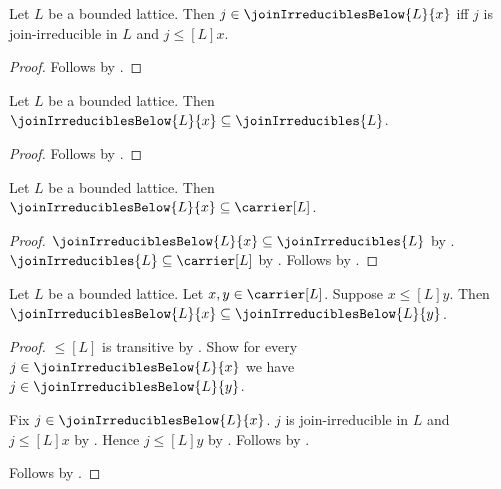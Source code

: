 \begin{proposition}\label{join_irreducibles_below_iff}
    Let $L$ be a bounded lattice.
    Then $j\in\joinIrreduciblesBelow{L}{x}$ iff
        $j$ is join-irreducible in $L$ and $j\mathrel{\leq[L]}x$.
\end{proposition}
\begin{proof}
    Follows by
        .
\end{proof}

\begin{proposition}\label{join_irreducibles_below_subseteq_join_irreducibles}
    Let $L$ be a bounded lattice.
    Then $\joinIrreduciblesBelow{L}{x}\subseteq\joinIrreducibles{L}$.
\end{proposition}
\begin{proof}
    Follows by .
\end{proof}

\begin{proposition}\label{join_irreducibles_below_subseteq_carrier}
    Let $L$ be a bounded lattice.
    Then $\joinIrreduciblesBelow{L}{x}\subseteq\carrier[L]$.
\end{proposition}
\begin{proof}
    $\joinIrreduciblesBelow{L}{x}\subseteq\joinIrreducibles{L}$ by
        .
    $\joinIrreducibles{L}\subseteq\carrier[L]$ by
        .
    Follows by .
\end{proof}

\begin{proposition}\label{join_irreducibles_below_monotone}
    Let $L$ be a bounded lattice.
    Let $x,y\in\carrier[L]$.
    Suppose $x\mathrel{\leq[L]}y$.
    Then $\joinIrreduciblesBelow{L}{x}
        \subseteq\joinIrreduciblesBelow{L}{y}$.
\end{proposition}
\begin{proof}
    $\leq[L]$ is transitive by .
    Show for every $j\in\joinIrreduciblesBelow{L}{x}$ we have
        $j\in\joinIrreduciblesBelow{L}{y}$.
    \begin{subproof}
        Fix $j\in\joinIrreduciblesBelow{L}{x}$.
        $j$ is join-irreducible in $L$ and $j\mathrel{\leq[L]}x$ by
            .
        Hence $j\mathrel{\leq[L]}y$ by .
        Follows by .
    \end{subproof}
    Follows by .
\end{proof}
